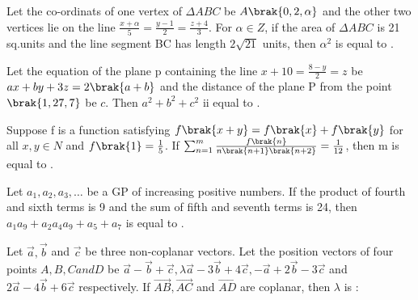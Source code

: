 \iffalse
\title{2023}   
\author{AI24Btech11024}
\section{integer}              
\fi
\item Let the co-ordinats of one vertex of $\Delta ABC$ be $A\brak{0, 2, \alpha}$ and the other two vertices lie on the line $\frac{x+\alpha}{5}=\frac{y-1}{2}=\frac{z+4}{3}$. For $\alpha\in Z$, if the area of $\Delta ABC$ is 21 sq.units and the line segment BC has length $2\sqrt{21}$ units, then $\alpha^{2}$ is equal to \underline{\hspace{2.5cm}}. \hfill{}

\item Let the equation of the plane p containing the line $x+10=\frac{8-y}{2}=z$ be $ax+by+3z=2\brak{a+b}$ and the distance of the plane P from the point $\brak{1, 27, 7}$ be $c$. Then $a^{2}+b^{2}+c^{2}$ ii equal to \underline{\hspace{2.5cm}}.\hfill{}

\item Suppose f is a function satisfying $f\brak{x+y}=f\brak{x}+f\brak{y}$ for all $x,y \in N$ and $f\brak{1}=\frac{1}{5}$. If $\sum_{n=1}^{m}\frac{f\brak{n}}{n\brak{n+1}\brak{n+2}}=\frac{1}{12}$, then m is equal to \underline{\hspace{2.5cm}}.    \hfill{}

\item Let $a_{1},a_{2},a_{3},\ldots$ be a GP of increasing positive numbers. If the product of fourth and sixth terms is 9 and the sum of fifth and seventh terms is 24, then $a_{1}a_{9}+a_{2}a_{4}a_{9}+a_{5}+a_{7}$ is equal to \underline{\hspace{2.5cm}}.  \hfill{}

\item Let $\overrightarrow{a},\overrightarrow{b}$ and $\overrightarrow{c}$ be three non-coplanar vectors. Let the position vectors of four points $A, B, C and D$ be $\overrightarrow{a}-\overrightarrow{b}+\overrightarrow{c},\lambda\overrightarrow{a}-3\overrightarrow{b}+4\overrightarrow{c},-\overrightarrow{a}+2\overrightarrow{b}-3\overrightarrow{c}$ and $2\overrightarrow{a}-4\overrightarrow{b}+6\overrightarrow{c}$ respectively. If $\overrightarrow{AB},\overrightarrow{AC}$ and $\overrightarrow{AD}$ are coplanar, then $\lambda$ is $\colon$ \hfill{}

